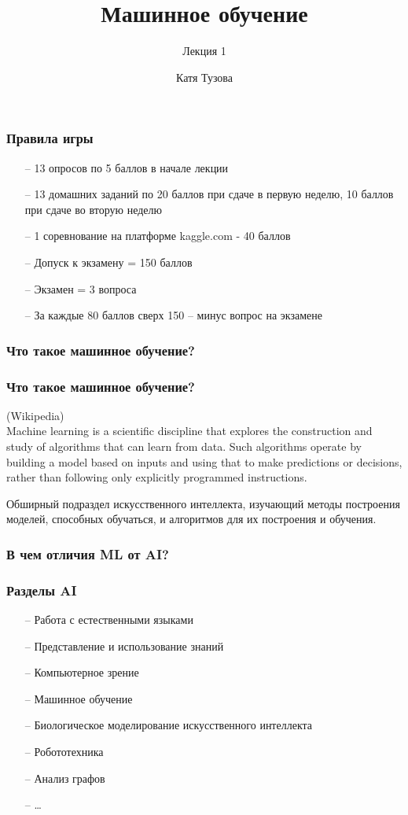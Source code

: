 \documentclass[12pt]{beamer}
\author{Катя Тузова}
\title{Машинное обучение}
\subtitle{Лекция 1}
\institute{JetBrains}
\date{}
\begin{document}
\frame{\titlepage}

\begin{frame}\frametitle{Правила игры}
\begin{itemize}
  \item[--] 13 опросов по 5 баллов в начале лекции
  \item[--] 13 домашних заданий по 20 баллов при сдаче в первую неделю, 
  10 баллов при сдаче во вторую неделю
  \item[--] 1 соревнование на платформе kaggle.com - 40 баллов
  \vspace{5mm}
  \item[--] Допуск к экзамену = 150 баллов
  \item[--] Экзамен = 3 вопроса
  \item[--] За каждые 80 баллов сверх 150 -- минус вопрос на экзамене
\end{itemize}
\end{frame}

\begin{frame}\frametitle{Что такое машинное обучение?}
\end{frame}

\begin{frame}\frametitle{Что такое машинное обучение?}
(Wikipedia)\\
Machine learning is a scientific discipline that explores the construction and study of algorithms that can learn from data. Such algorithms operate by building a model based on inputs and using that to make predictions or decisions, rather than following only explicitly programmed instructions. 
\vspace{5mm}

Обширный подраздел искусственного интеллекта, изучающий методы построения моделей, способных обучаться, и алгоритмов для их построения и обучения.\\

\end{frame}

\begin{frame}\frametitle{В чем отличия ML от AI?}
\end{frame}

\begin{frame}\frametitle{Разделы AI}
\begin{itemize}
  \item[--] Работа с естественными языками
\item[--] Представление и использование знаний
\item[--] Компьютерное зрение
\item[--] Машинное обучение
\item[--] Биологическое моделирование искусственного интеллекта
\item[--] Робототехника
\item[--] Анализ графов
\item[--] \ldots
\end{itemize}
\end{frame}
\end{document}
